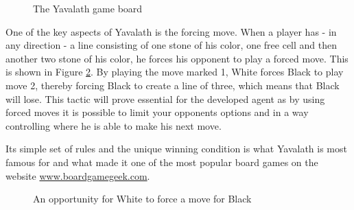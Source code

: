 \documentclass[11pt]{article}
\begin{document}
\begin{figure}[ht]
	\centering{
		\scalebox{\yavalathboardsize}{
			\begin{tikzpicture}
				\yavalathboard
			\end{tikzpicture}
		}
	}
	\caption{The Yavalath game board}
	\label{fig:emptyboard}
\end{figure}

One of the key aspects of Yavalath is the forcing move. When a player has - in any direction - a line consisting of one stone of his color, one free cell and then another two stone of his color, he forces his opponent to play a forced move. This is shown in Figure \ref{fig:forcedmoves}. By playing the move marked 1, White forces Black to play move 2, thereby forcing Black to create a line of three, which means that Black will lose. This tactic will prove essential for the developed agent as by using forced moves it is possible to limit your opponents options and in a way controlling where he is able to make his next move.

Its simple set of rules and the unique winning condition is what Yavalath is most famous for and what made it one of the most popular board games on the website \url{www.boardgamegeek.com}. 

\begin{figure}[ht]
	\caption{An opportunity for White to force a move for Black}
	\label{fig:forcedmoves}
\end{figure}

	\nocite{*}
	\printbibliography
\end{document}
